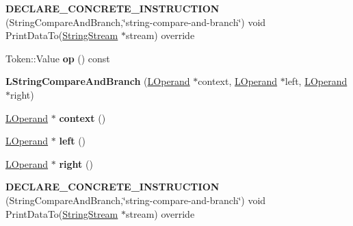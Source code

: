 \begin{DoxyCompactItemize}
\item 
{\bfseries D\+E\+C\+L\+A\+R\+E\+\_\+\+C\+O\+N\+C\+R\+E\+T\+E\+\_\+\+I\+N\+S\+T\+R\+U\+C\+T\+I\+ON} (String\+Compare\+And\+Branch,\char`\"{}string-\/compare-\/and-\/branch\char`\"{}) void Print\+Data\+To(\hyperlink{classv8_1_1internal_1_1_string_stream}{String\+Stream} $\ast$stream) override\hypertarget{classv8_1_1internal_1_1_l_string_compare_and_branch_a2409386853dc077bb377a4f8b8eaf483}{}\label{classv8_1_1internal_1_1_l_string_compare_and_branch_a2409386853dc077bb377a4f8b8eaf483}

\item 
Token\+::\+Value {\bfseries op} () const \hypertarget{classv8_1_1internal_1_1_l_string_compare_and_branch_a1cb19d2583db6113ac7e91498f484880}{}\label{classv8_1_1internal_1_1_l_string_compare_and_branch_a1cb19d2583db6113ac7e91498f484880}

\item 
{\bfseries L\+String\+Compare\+And\+Branch} (\hyperlink{classv8_1_1internal_1_1_l_operand}{L\+Operand} $\ast$context, \hyperlink{classv8_1_1internal_1_1_l_operand}{L\+Operand} $\ast$left, \hyperlink{classv8_1_1internal_1_1_l_operand}{L\+Operand} $\ast$right)\hypertarget{classv8_1_1internal_1_1_l_string_compare_and_branch_abdd07c36cdda51e9673d4ee4dfc2734d}{}\label{classv8_1_1internal_1_1_l_string_compare_and_branch_abdd07c36cdda51e9673d4ee4dfc2734d}

\item 
\hyperlink{classv8_1_1internal_1_1_l_operand}{L\+Operand} $\ast$ {\bfseries context} ()\hypertarget{classv8_1_1internal_1_1_l_string_compare_and_branch_a15d4b6ad859b22bf4141edc055fe8050}{}\label{classv8_1_1internal_1_1_l_string_compare_and_branch_a15d4b6ad859b22bf4141edc055fe8050}

\item 
\hyperlink{classv8_1_1internal_1_1_l_operand}{L\+Operand} $\ast$ {\bfseries left} ()\hypertarget{classv8_1_1internal_1_1_l_string_compare_and_branch_a03846e908189b71209c862508f37b51a}{}\label{classv8_1_1internal_1_1_l_string_compare_and_branch_a03846e908189b71209c862508f37b51a}

\item 
\hyperlink{classv8_1_1internal_1_1_l_operand}{L\+Operand} $\ast$ {\bfseries right} ()\hypertarget{classv8_1_1internal_1_1_l_string_compare_and_branch_acb46bd2af08a91bc102ec2b5e919c6b5}{}\label{classv8_1_1internal_1_1_l_string_compare_and_branch_acb46bd2af08a91bc102ec2b5e919c6b5}

\item 
{\bfseries D\+E\+C\+L\+A\+R\+E\+\_\+\+C\+O\+N\+C\+R\+E\+T\+E\+\_\+\+I\+N\+S\+T\+R\+U\+C\+T\+I\+ON} (String\+Compare\+And\+Branch,\char`\"{}string-\/compare-\/and-\/branch\char`\"{}) void Print\+Data\+To(\hyperlink{classv8_1_1internal_1_1_string_stream}{String\+Stream} $\ast$stream) override\hypertarget{classv8_1_1internal_1_1_l_string_compare_and_branch_a2409386853dc077bb377a4f8b8eaf483}{}\label{classv8_1_1internal_1_1_l_string_compare_and_branch_a2409386853dc077bb377a4f8b8eaf483}


\end{DoxyCompactItemize}
